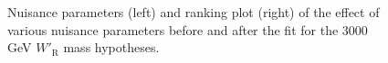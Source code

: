 \begin{figure}[H]
  \centering
  \caption{Nuisance parameters (left) and ranking plot (right) of the effect of various nuisance parameters before and after the fit for the 3000 GeV $W'_{\text{R}}$ mass hypotheses.}
  \label{fig:NuisParAndRanking_WpRH3000}
\end{figure}
